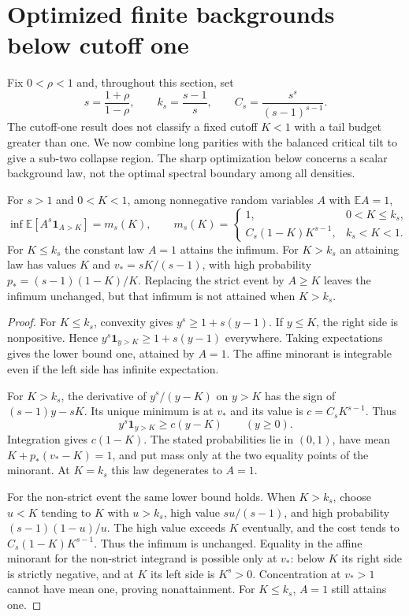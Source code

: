 \section{Optimized finite backgrounds below cutoff one}\label{sec:background}
Fix $0<\rho<1$ and, throughout this section, set
\[
 s=\frac{1+\rho}{1-\rho},\qquad k_s=\frac{s-1}{s},\qquad
 C_s=\frac{s^s}{(s-1)^{s-1}}.
\]
The cutoff-one result does not classify a fixed cutoff $K<1$ with
a tail budget greater than one. We now combine long parities with the
balanced critical tilt to give a sub-two collapse region. The sharp
optimization below concerns a scalar background law, not the optimal
spectral boundary among all densities.

\begin{proposition}\label{prop:background-optimum}
For $s>1$ and $0<K<1$, among nonnegative random variables $A$ with
$\mathbb E A=1$,
\[
 \inf\mathbb E[A^s\mathbf1_{A>K}]=m_s(K),\qquad
 m_s(K)=\begin{cases}
 1,&0<K\le k_s,\\
 C_s(1-K)K^{s-1},&k_s<K<1.
 \end{cases}
\]
For $K\le k_s$ the constant law $A=1$ attains the infimum. For $K>k_s$
an attaining law has values $K$ and $v_*=sK/(s-1)$, with high probability
$p_*=(s-1)(1-K)/K$. Replacing the strict event by $A\ge K$ leaves
the infimum unchanged, but that infimum is not attained when $K>k_s$.
\end{proposition}
\begin{proof}
For $K\le k_s$, convexity gives $y^s\ge1+s(y-1)$. If $y\le K$, the
right side is nonpositive. Hence $y^s\mathbf1_{y>K}\ge1+s(y-1)$
everywhere. Taking expectations gives the lower bound one, attained
by $A=1$. The affine minorant is integrable even if the left side has
infinite expectation.

For $K>k_s$, the derivative of $y^s/(y-K)$ on $y>K$ has the sign
of $(s-1)y-sK$. Its unique minimum is at $v_*$ and its value is
$c=C_sK^{s-1}$. Thus
\[
 y^s\mathbf1_{y>K}\ge c(y-K)\qquad(y\ge0).
\]
Integration gives $c(1-K)$. The stated probabilities lie in $(0,1)$,
have mean $K+p_*(v_*-K)=1$, and put mass only at the two equality
points of the minorant. At $K=k_s$ this law degenerates to $A=1$.

For the non-strict event the same lower bound holds. When $K>k_s$,
choose $u<K$ tending to $K$ with $u>k_s$, high value $su/(s-1)$,
and high probability $(s-1)(1-u)/u$. The high value exceeds $K$
eventually, and the cost tends to $C_s(1-K)K^{s-1}$. Thus the
infimum is unchanged. Equality in the affine minorant for the
non-strict integrand is possible only at $v_*$: below $K$ its
right side is strictly negative, and at $K$ its left side is $K^s>0$.
Concentration at $v_*>1$ cannot have mean one, proving nonattainment.
For $K\le k_s$, $A=1$ still attains one.
\end{proof}

